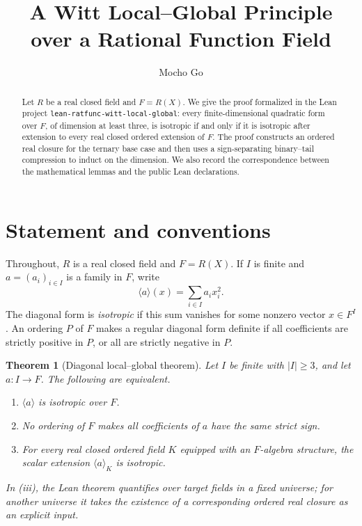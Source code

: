 \documentclass[uplatex,dvipdfmx]{jsarticle}
\title{A Witt Local--Global Principle over a Rational Function Field}
\author{Mocho Go}
\date{}
\newtheorem{theorem}{Theorem}
\theoremstyle{definition}
\theoremstyle{remark}
\begin{document}
\maketitle

\begin{abstract}
Let $R$ be a real closed field and $F=R(X)$.  We give the proof formalized
in the Lean project \texttt{lean-ratfunc-witt-local-global}: every finite-dimensional
quadratic form over $F$, of dimension at least three, is isotropic if and
only if it is isotropic after extension to every real closed ordered extension
of $F$.  The proof constructs an ordered real closure for the ternary base
case and then uses a sign-separating binary--tail compression to induct on the
dimension.  We also record the correspondence between the mathematical lemmas
and the public Lean declarations.
\end{abstract}

\section{Statement and conventions}

Throughout, $R$ is a real closed field and $F=R(X)$.  If $I$ is finite
and $a=(a_i)_{i\in I}$ is a family in $F$, write
\[
  \langle a\rangle(x)=\sum_{i\in I}a_i x_i^2.
\]
The diagonal form is \emph{isotropic} if this sum vanishes for some nonzero
vector $x\in F^I$.  An ordering $P$ of $F$ makes a regular diagonal form
definite if all coefficients are strictly positive in $P$, or all are
strictly negative in $P$.

\begin{theorem}[Diagonal local--global theorem]\label{thm:diagonal}
Let $I$ be finite with $|I|\ge3$, and let $a:I\to F$.  The following are
equivalent.
\begin{enumerate}[label=(\roman*)]
  \item $\langle a\rangle$ is isotropic over $F$.
  \item No ordering of $F$ makes all coefficients of $a$ have the same
        strict sign.
  \item For every real closed ordered field $K$ equipped with an
        $F$-algebra structure, the scalar extension
        $\langle a\rangle_K$ is isotropic.
\end{enumerate}
In (iii), the Lean theorem quantifies over target fields in a fixed universe;
for another universe it takes the existence of a corresponding ordered real
closure as an explicit input.
\end{theorem}
\end{document}
